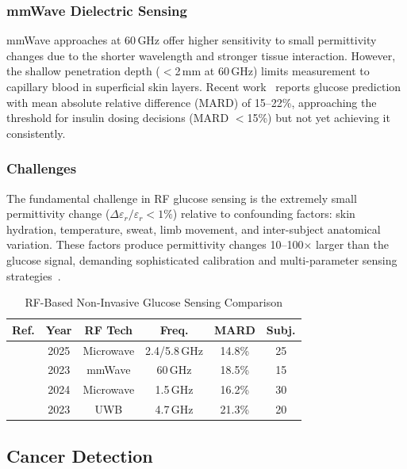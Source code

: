 \documentclass[journal,twoside]{IEEEtran}
\begin{document}
\subsubsection{mmWave Dielectric Sensing}
mmWave approaches at 60\,GHz offer higher sensitivity to small permittivity changes due to the shorter wavelength and stronger tissue interaction. However, the shallow penetration depth ($<$2\,mm at 60\,GHz) limits measurement to capillary blood in superficial skin layers. Recent work~\cite{ref_mmwave_review2023} reports glucose prediction with mean absolute relative difference (MARD) of 15--22\%, approaching the threshold for insulin dosing decisions (MARD $<$15\%) but not yet achieving it consistently.

\subsubsection{Challenges}
The fundamental challenge in RF glucose sensing is the extremely small permittivity change ($\Delta\varepsilon_r/\varepsilon_r < 1\%$) relative to confounding factors: skin hydration, temperature, sweat, limb movement, and inter-subject anatomical variation. These factors produce permittivity changes 10--100$\times$ larger than the glucose signal, demanding sophisticated calibration and multi-parameter sensing strategies~\cite{ref_glucose_dualband2025}.

\begin{table}[!t]
\centering
\caption{RF-Based Non-Invasive Glucose Sensing Comparison}
\label{tab:glucose}
\footnotesize
\setlength{\tabcolsep}{2.5pt}
\begin{tabular}{@{}L{1.2cm} c c c c c@{}}
\toprule
\textbf{Ref.} & \textbf{Year} & \textbf{RF Tech} & \textbf{Freq.} & \textbf{MARD} & \textbf{Subj.} \\
\midrule
\cite{ref_glucose_dualband2025} & 2025 & Microwave & 2.4/5.8\,GHz & 14.8\% & 25 \\
\cite{ref_mmwave_review2023} & 2023 & mmWave & 60\,GHz & 18.5\% & 15 \\
\cite{ref_glucose_meta2024} & 2024 & Microwave & 1.5\,GHz & 16.2\% & 30 \\
\cite{ref_glucose_uwb2023} & 2023 & UWB & 4.7\,GHz & 21.3\% & 20 \\
\bottomrule
\end{tabular}
\end{table}

\subsection{Cancer Detection}
\label{subsec:cancer}
\end{document}

